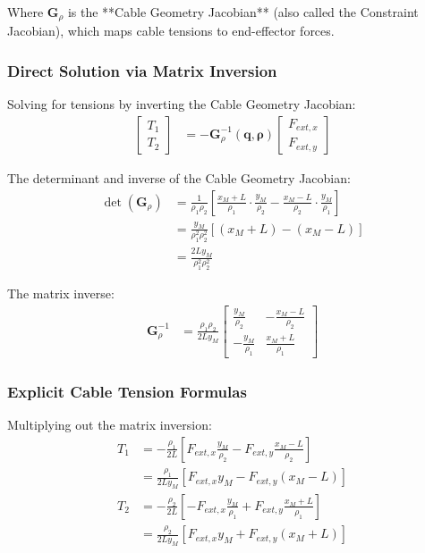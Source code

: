 Where $\bm{G}_{\rho}$ is the **Cable Geometry Jacobian** (also called the Constraint Jacobian), which maps cable tensions to end-effector forces.

\subsubsection{Direct Solution via Matrix Inversion}

Solving for tensions by inverting the Cable Geometry Jacobian:
\begin{align}
\begin{bmatrix} T_1 \\ T_2 \end{bmatrix} &= -\bm{G}_{\rho}^{-1}(\bm{q}, \bm{\rho}) \begin{bmatrix} F_{ext,x} \\ F_{ext,y} \end{bmatrix}
\end{align}

The determinant and inverse of the Cable Geometry Jacobian:
\begin{align}
\det(\bm{G}_{\rho}) &= \frac{1}{\rho_1 \rho_2} \left[ \frac{x_M + L}{\rho_1} \cdot \frac{y_M}{\rho_2} - \frac{x_M - L}{\rho_2} \cdot \frac{y_M}{\rho_1} \right] \\
&= \frac{y_M}{\rho_1^2 \rho_2^2} \left[ (x_M + L) - (x_M - L) \right] \\
&= \frac{2L y_M}{\rho_1^2 \rho_2^2}
\end{align}

The matrix inverse:
\begin{align}
\bm{G}_{\rho}^{-1} &= \frac{\rho_1 \rho_2}{2L y_M} \begin{bmatrix}
\frac{y_M}{\rho_2} & -\frac{x_M - L}{\rho_2} \\
-\frac{y_M}{\rho_1} & \frac{x_M + L}{\rho_1}
\end{bmatrix}
\end{align}

\subsubsection{Explicit Cable Tension Formulas}

Multiplying out the matrix inversion:
\begin{align}
T_1 &= -\frac{\rho_1}{2L} \left[ F_{ext,x} \frac{y_M}{\rho_2} - F_{ext,y} \frac{x_M - L}{\rho_2} \right] \\
&= \frac{\rho_1}{2L y_M} \left[ F_{ext,x} y_M - F_{ext,y} (x_M - L) \right] \\
T_2 &= -\frac{\rho_2}{2L} \left[ -F_{ext,x} \frac{y_M}{\rho_1} + F_{ext,y} \frac{x_M + L}{\rho_1} \right] \\
&= \frac{\rho_2}{2L y_M} \left[ F_{ext,x} y_M + F_{ext,y} (x_M + L) \right]
\end{align}

